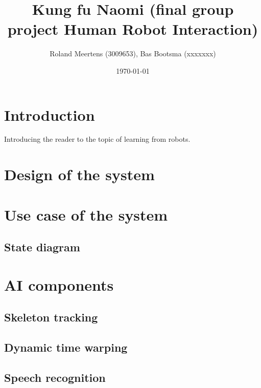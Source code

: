 \documentclass[a4paper,10pt]{article}
\begin{document}
\title{Kung fu Naomi (final group project Human Robot Interaction)}

\author{Roland Meertens (3009653), Bas Bootsma (xxxxxxx)}

\date{\today}

\maketitle



\section{Introduction}
Introducing the reader to the topic of learning from robots. 

\section{Design of the system}

\section{Use case of the system}

\subsection{State diagram}
\section{AI components}

\subsection{Skeleton tracking}
\subsection{Dynamic time warping}

\subsection{Speech recognition}
\end{document}
